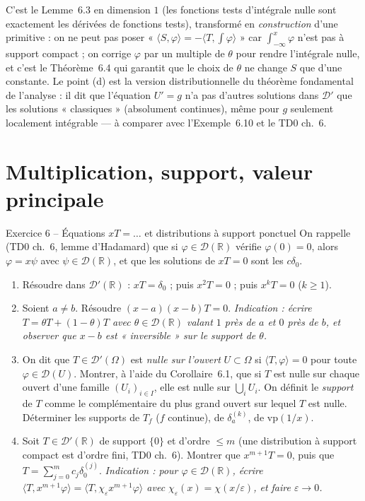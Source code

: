 \documentclass[11pt,a4paper]{article}
\newcommand{\R}{\mathbb{R}}
\newcommand{\D}{\mathcal{D}}
\theoremstyle{definition}
\begin{document}
\begin{commentaire}
C'est le Lemme~6.3 en dimension $1$ (les fonctions tests d'intégrale nulle sont exactement les dérivées de fonctions tests), transformé en \emph{construction} d'une primitive : on ne peut pas poser « $\langle S,\varphi\rangle=-\langle T,\int\varphi\rangle$ » car $\int_{-\infty}^x\varphi$ n'est pas à support compact ; on corrige $\varphi$ par un multiple de $\theta$ pour rendre l'intégrale nulle, et c'est le Théorème~6.4 qui garantit que le choix de $\theta$ ne change $S$ que d'une constante. Le point (d) est la version distributionnelle du théorème fondamental de l'analyse : il dit que l'équation $U'=g$ n'a pas d'autres solutions dans $\D'$ que les solutions « classiques » (absolument continues), même pour $g$ seulement localement intégrable — à comparer avec l'Exemple~6.10 et le TD0 ch.~6.
\end{commentaire}

\section*{Multiplication, support, valeur principale}

\begin{exo}{Exercice 6 -- Équations $xT=\dots$ et distributions à support ponctuel}
On rappelle (TD0 ch.~6, lemme d'Hadamard) que si $\varphi\in\D(\R)$ vérifie $\varphi(0)=0$, alors $\varphi=x\psi$ avec $\psi\in\D(\R)$, et que les solutions de $xT=0$ sont les $c\delta_0$.
\begin{enumerate}[label=(\alph*)]
  \item Résoudre dans $\D'(\R)$ : $xT=\delta_0$ ; puis $x^2T=0$ ; puis $x^kT=0$ ($k\ge1$).
  \item Soient $a\ne b$. Résoudre $(x-a)(x-b)T=0$. \emph{Indication : écrire $T=\theta T+(1-\theta)T$ avec $\theta\in\D(\R)$ valant $1$ près de $a$ et $0$ près de $b$, et observer que $x-b$ est « inversible » sur le support de $\theta$.}
  \item On dit que $T\in\D'(\Omega)$ est \emph{nulle sur l'ouvert} $U\subset\Omega$ si $\langle T,\varphi\rangle=0$ pour toute $\varphi\in\D(U)$. Montrer, à l'aide du Corollaire~6.1, que si $T$ est nulle sur chaque ouvert d'une famille $(U_i)_{i\in I}$, elle est nulle sur $\bigcup_iU_i$. On définit le \emph{support} de $T$ comme le complémentaire du plus grand ouvert sur lequel $T$ est nulle. Déterminer les supports de $T_f$ ($f$ continue), de $\delta_a^{(k)}$, de $\mathrm{vp}(1/x)$.
  \item Soit $T\in\D'(\R)$ de support $\{0\}$ et d'ordre $\le m$ (une distribution à support compact est d'ordre fini, TD0 ch.~6). Montrer que $x^{m+1}T=0$, puis que $T=\sum_{j=0}^mc_j\delta_0^{(j)}$. \emph{Indication : pour $\varphi\in\D(\R)$, écrire $\langle T,x^{m+1}\varphi\rangle=\langle T,\chi_\varepsilon x^{m+1}\varphi\rangle$ avec $\chi_\varepsilon(x)=\chi(x/\varepsilon)$, et faire $\varepsilon\to0$.}
\end{enumerate}
\end{exo}
\end{document}

